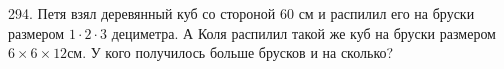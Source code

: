 294. Петя взял деревянный куб со стороной 60 см и распилил его на бруски размером $1\cdot2\cdot3$ дециметра. А Коля распилил такой же куб на бруски размером $6\times6\times12$см. У кого получилось больше брусков и на сколько?\\
